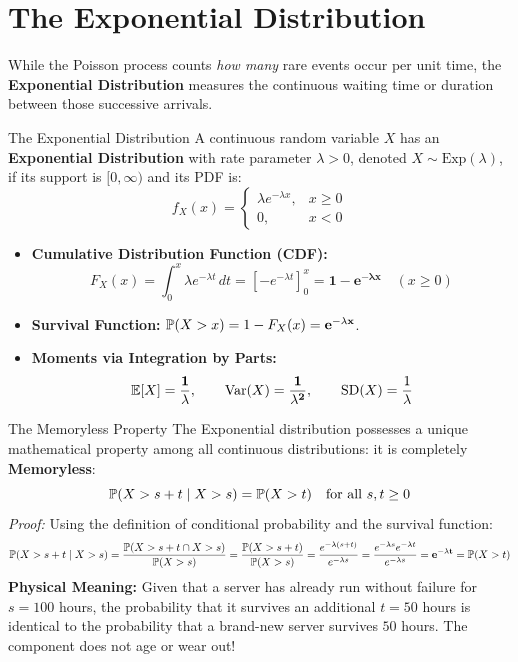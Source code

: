 \section{The Exponential Distribution}

While the Poisson process counts \emph{how many} rare events occur per unit time, the \textbf{Exponential Distribution} measures the continuous waiting time or duration between those successive arrivals.

\begin{definitionbox}{The Exponential Distribution}
A continuous random variable $X$ has an \textbf{Exponential Distribution} with rate parameter $\lambda > 0$, denoted $X \sim \text{Exp}(\lambda)$, if its support is $[0, \infty)$ and its PDF is:
$$f_X(x) = \begin{cases}
\lambda e^{-\lambda x}, & x \ge 0 \\
0, & x < 0
\end{cases}$$
\begin{itemize}
    \item \textbf{Cumulative Distribution Function (CDF):}
    $$F_X(x) = \int_0^x \lambda e^{-\lambda t} \, dt = \left[-e^{-\lambda t}\right]_0^x = \mathbf{1 - e^{-\lambda x}} \quad (x \ge 0)$$
    \item \textbf{Survival Function:} $\P(X > x) = 1 - F_X(x) = \mathbf{e^{-\lambda x}}$.
    \item \textbf{Moments via Integration by Parts:}
    $$\E[X] = \mathbf{\frac{1}{\lambda}}, \qquad \Var(X) = \mathbf{\frac{1}{\lambda^2}}, \qquad \SD(X) = \frac{1}{\lambda}$$
\end{itemize}
\end{definitionbox}

\begin{theorembox}{The Memoryless Property}
The Exponential distribution possesses a unique mathematical property among all continuous distributions: it is completely \textbf{Memoryless}:
$$\P(X > s + t \mid X > s) = \P(X > t) \quad \text{for all } s, t \ge 0$$
\textit{Proof:} Using the definition of conditional probability and the survival function:
$$\P(X > s + t \mid X > s) = \frac{\P(X > s + t \cap X > s)}{\P(X > s)} = \frac{\P(X > s + t)}{\P(X > s)} = \frac{e^{-\lambda(s + t)}}{e^{-\lambda s}} = \frac{e^{-\lambda s} e^{-\lambda t}}{e^{-\lambda s}} = \mathbf{e^{-\lambda t}} = \P(X > t)$$
\textbf{Physical Meaning:} Given that a server has already run without failure for $s = 100$ hours, the probability that it survives an additional $t = 50$ hours is identical to the probability that a brand-new server survives $50$ hours. The component does not age or wear out!
\end{theorembox}

